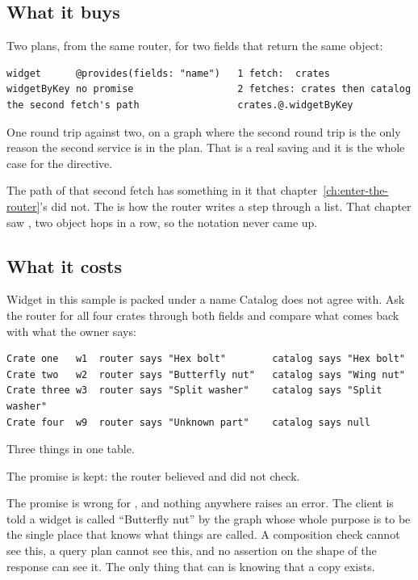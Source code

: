 \subsection*{What it buys}

Two plans, from the same router, for two fields that return the same object:

\begin{verbatim}
widget      @provides(fields: "name")   1 fetch:  crates
widgetByKey no promise                  2 fetches: crates then catalog
the second fetch's path                 crates.@.widgetByKey
\end{verbatim}

One round trip against two, on a graph where the second round trip is the only
reason the second service is in the plan. That is a real saving and it is the
whole case for the directive.

%
The path of that second fetch has something in it that
chapter~\ref{ch:enter-the-router}'s did not. The  is how the router
writes a step through a list. That chapter saw
, two object hops in a row, so the notation never
came up.

\subsection*{What it costs}

%
Widget  in this sample is packed under a name Catalog does not agree
with. Ask the router for all four crates through both fields and compare what
comes back with what the owner says:

\begin{verbatim}
Crate one   w1  router says "Hex bolt"        catalog says "Hex bolt"
Crate two   w2  router says "Butterfly nut"   catalog says "Wing nut"
Crate three w3  router says "Split washer"    catalog says "Split washer"
Crate four  w9  router says "Unknown part"    catalog says null
\end{verbatim}

Three things in one table.

The promise is kept: the router believed  and did not check.

The promise is wrong for , and nothing anywhere raises an error. The
client is told a widget is called \enquote{Butterfly nut} by the graph whose
whole purpose is to be the single place that knows what things are called. A
composition check cannot see this, a query plan cannot see this, and no
assertion on the shape of the response can see it. The only thing that can is
knowing that a copy exists.

